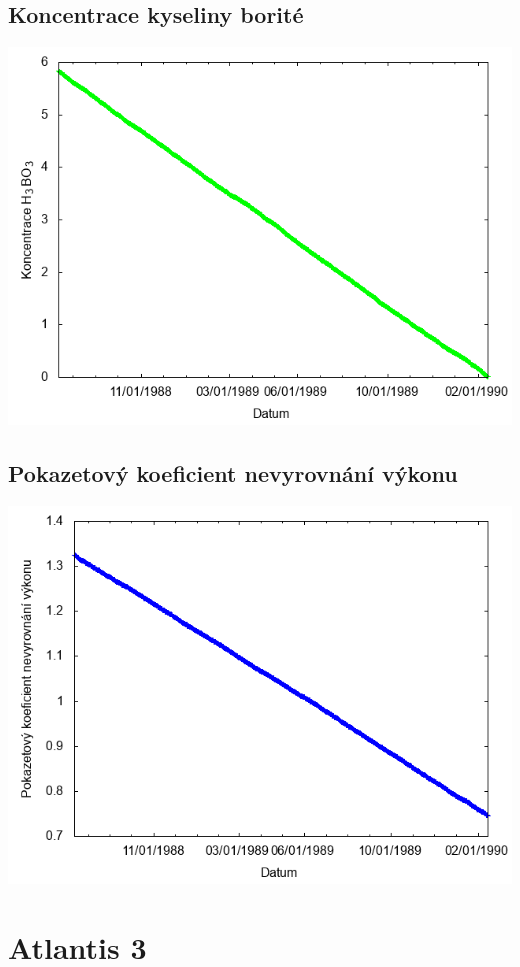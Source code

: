 \documentclass[a4paper,twoside,11pt]{article}
\begin{document}
\subsection*{Koncentrace kyseliny borité}
\begin{center}
\includegraphics[width=.8\textwidth]{graphs/Atlantis_02_bc.png}
\end{center}

\subsection*{Pokazetový koeficient nevyrovnání výkonu}
\begin{center}
\includegraphics[width=.8\textwidth]{graphs/Atlantis_02_fha.png}
\end{center}

\newpage
\section*{Atlantis 3}
\end{document}
